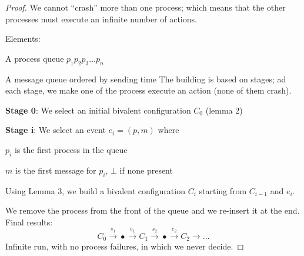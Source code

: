 \documentclass[12pt]{article}
\begin{document}
\begin{proof}
We cannot ``crash'' more than one process; which means that the other
processes must execute an infinite number of actions.

Elements:
\BI
\item A process queue $p_1 p_2 p_3 \ldots p_n$
\item A message queue ordered by sending time
\EI
The building is based on stages; ad each stage, we make one of the process
execute an action (none of them crash).

\BI
\item {\bf Stage 0}: We select an initial bivalent configuration $C_0$ (lemma 2)
\item {\bf Stage i}: We select an event $e_i = (p, m)$ where 
  \BI
  \item $p_i$ is the first process in the queue
  \item $m$ is the first message for $p_i$, $\bot$ if none present
  \EI
\item Using Lemma 3, we build a bivalent configuration $C_i$ starting
  from $C_{i-1}$ and $e_i$.
\item We remove the process from the front of the queue and we re-insert
  it at the end.
\EI
Final results:
\[
  C_0 \xrightarrow{s_1} \bullet \xrightarrow{e_1} C_1 \xrightarrow{s_2} \bullet \xrightarrow{e_2} C_2 \rightarrow \ldots
\]
Infinite run, with no process failures, in which we never decide.

\end{proof}



 
\end{document}

